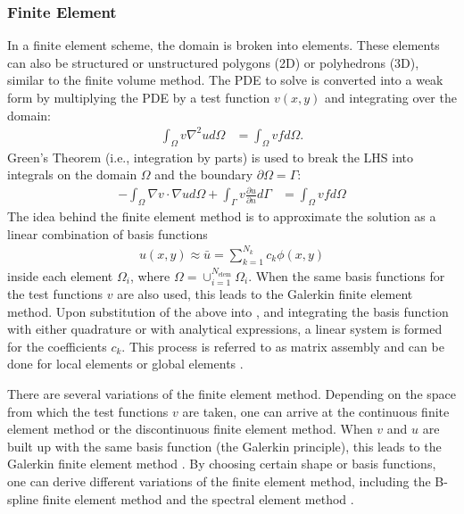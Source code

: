 \subsubsection{Finite Element}

In a finite element scheme, the domain is broken into elements. These elements can also be structured or unstructured polygons (2D) or polyhedrons (3D), similar to the finite volume method. The PDE to solve is converted into a weak form by multiplying the PDE by a test function $v(x,y)$ and integrating over the domain:
\begin{align}
    \int_{\Omega} v \nabla^2 u d\Omega &= \int_{\Omega} vf d\Omega.
\end{align}
Green's Theorem (i.e., integration by parts) is used to break the LHS into integrals on the domain $\Omega$ and the boundary $\partial \Omega = \Gamma$:
\begin{align}
    -\int_{\Omega} \nabla v \cdot \nabla u d\Omega + \int_{\Gamma} v \frac{\partial u}{\partial n} d\Gamma &= \int_{\Omega} vf d\Omega
    \label{eq:poisson_weak_form}
\end{align}
The idea behind the finite element method is to approximate the solution as a linear combination of basis functions
\begin{align}
    u(x,y) \approx \bar{u} = \sum_{k=1}^{N_k} c_k \phi(x,y)
\end{align}
inside each element $\Omega_i$, where $\Omega = \cup_{i = 1}^{N_{\text{elem}}} \Omega_i$. When the same basis functions for the test functions $v$ are also used, this leads to the Galerkin finite element method. Upon substitution of the above into , and integrating the basis function with either quadrature or with analytical expressions, a linear system is formed for the coefficients $c_k$. This process is referred to as matrix assembly and can be done for local elements or global elements \citep{giraldo2020introduction}.

There are several variations of the finite element method. Depending on the space from which the test functions $v$ are taken, one can arrive at the continuous finite element method or the discontinuous finite element method. When $v$ and $u$ are built up with the same basis function (the Galerkin principle), this leads to the Galerkin finite element method \citep{thomee2007galerkin}. By choosing certain shape or basis functions, one can derive different variations of the finite element method, including the B-spline finite element method \citep{kagan1998new} and the spectral element method \citep{patera1984spectral}.

